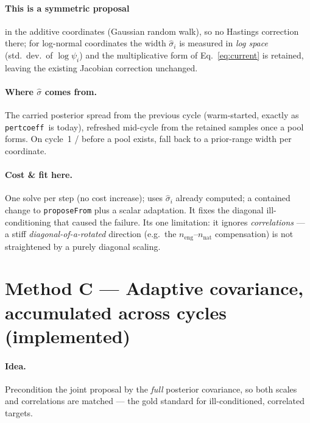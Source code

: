 \documentclass[11pt]{article}
\newcommand{\code}[1]{\texttt{\small #1}}
\newcommand{\pc}{\code{pertcoeff}}
\begin{document}
\paragraph{This is a symmetric proposal} in the additive coordinates
(Gaussian random walk), so no Hastings correction there; for log-normal
coordinates the width $\hat\sigma_i$ is measured in \emph{log space}
(std.\ dev.\ of $\log\psi_i$) and the multiplicative form of
Eq.~\eqref{eq:current} is retained, leaving the existing Jacobian
correction unchanged.

\paragraph{Where $\hat\sigma$ comes from.} The carried posterior spread
from the previous cycle (warm-started, exactly as \pc\ is today), refreshed
mid-cycle from the retained samples once a pool forms. On cycle~1 / before
a pool exists, fall back to a prior-range width per coordinate.

\paragraph{Cost \& fit here.} One solve per step (no cost increase); uses
$\hat\sigma_i$ already computed; a contained change to \code{proposeFrom}
plus a scalar adaptation. It fixes the diagonal ill-conditioning that
caused the failure. Its one limitation: it ignores \emph{correlations} ---
a stiff \emph{diagonal-of-a-rotated} direction (e.g.\ the
$n_{\text{eng}}$--$n_{\text{nat}}$ compensation) is not straightened by a
purely diagonal scaling.

\section{Method C --- Adaptive covariance, accumulated across cycles (implemented)}

\paragraph{Idea.} Precondition the joint proposal by the \emph{full}
posterior covariance, so both scales and correlations are matched --- the
gold standard for ill-conditioned, correlated targets.
\end{document}
